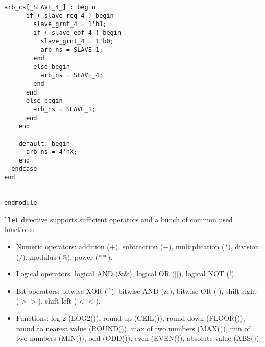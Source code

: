 \begin{lstlisting}[caption={4 slave arbiter \sv{} code}, label={lst:arb in sv}]
    arb_cs[_SLAVE_4_] : begin
      if ( slave_req_4 ) begin
        slave_grnt_4 = 1'b1;
        if ( slave_eof_4 ) begin
          slave_grnt_4 = 1'b0;
          arb_ns = SLAVE_1;
        end
        else begin
          arb_ns = SLAVE_4;
        end
      end
      else begin
        arb_ns = SLAVE_1;
      end
    end

    default: begin
      arb_ns = 4'hX;
    end
  endcase
end


endmodule
\end{lstlisting}



\`{}\texttt{let} directive supports sufficient operators and a bunch of common used functions:
\begin{itemize}
\item Numeric operators: addition (+), subtraction ($-$),  multiplication ($*$), division ($/$), 
modulus (\%), power ($**$).
\item Logical operators: logical AND (\&\&), logical OR ($||$), logical NOT ($!$).
\item Bit operators: bitwise XOR (\^{}), bitwise AND  (\&),  bitwise OR ($|$), 
shift right ($>>$), shift left ($<<$).
\item Functions: log 2 (LOG2()), round up (CEIL()), round down (FLOOR()), 
round to nearest value (ROUND()),  max of two numbers (MAX()), 
min of two numbers (MIN()), odd (ODD()), even (EVEN()), absolute value (ABS()).
\end{itemize}

